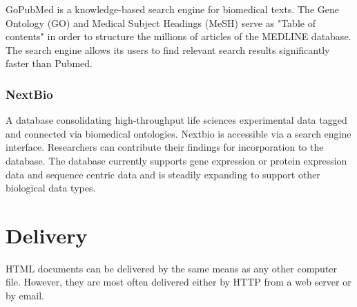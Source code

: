 GoPubMed is a knowledge-based search engine for biomedical texts. The Gene Ontology (GO) and Medical Subject Headings (MeSH) serve as "Table of contents" in order to structure the millions of articles of the MEDLINE database. The search engine allows its users to find relevant search results significantly faster than Pubmed.


\subsection{NextBio}

A database consolidating high-throughput life sciences experimental data tagged and connected via biomedical ontologies. Nextbio is accessible via a search engine interface. Researchers can contribute their findings for incorporation to the database. The database currently supports gene expression or protein expression data and sequence centric data and is steadily expanding to support other biological data types.













\chapter{Delivery}

HTML documents can be delivered by the same means as any other computer file. However, they are most often delivered either by HTTP from a web server or by email.

